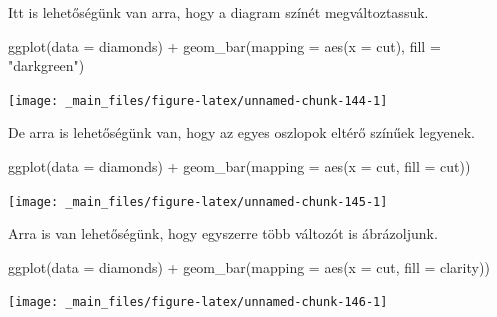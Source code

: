 \documentclass[
]{book}
\newenvironment{Shaded}{\begin{snugshade}}{\end{snugshade}}
\newcommand{\AttributeTok}[1]{\textcolor[rgb]{0.77,0.63,0.00}{#1}}
\newcommand{\FunctionTok}[1]{\textcolor[rgb]{0.00,0.00,0.00}{#1}}
\newcommand{\NormalTok}[1]{#1}
\newcommand{\SpecialCharTok}[1]{\textcolor[rgb]{0.00,0.00,0.00}{#1}}
\newcommand{\StringTok}[1]{\textcolor[rgb]{0.31,0.60,0.02}{#1}}
\begin{document}
Itt is lehetőségünk van arra, hogy a diagram színét megváltoztassuk.

\begin{Shaded}
\begin{Highlighting}[]
\FunctionTok{ggplot}\NormalTok{(}\AttributeTok{data =}\NormalTok{ diamonds) }\SpecialCharTok{+}
  \FunctionTok{geom\_bar}\NormalTok{(}\AttributeTok{mapping =} \FunctionTok{aes}\NormalTok{(}\AttributeTok{x =}\NormalTok{ cut), }\AttributeTok{fill =} \StringTok{"darkgreen"}\NormalTok{)}
\end{Highlighting}
\end{Shaded}

\begin{center}\texttt{[image: \_main\_files/figure-latex/unnamed-chunk-144-1]} \end{center}

De arra is lehetőségünk van, hogy az egyes oszlopok eltérő színűek
legyenek.

\begin{Shaded}
\begin{Highlighting}[]
\FunctionTok{ggplot}\NormalTok{(}\AttributeTok{data =}\NormalTok{ diamonds) }\SpecialCharTok{+}
  \FunctionTok{geom\_bar}\NormalTok{(}\AttributeTok{mapping =} \FunctionTok{aes}\NormalTok{(}\AttributeTok{x =}\NormalTok{ cut, }\AttributeTok{fill =}\NormalTok{ cut))}
\end{Highlighting}
\end{Shaded}

\begin{center}\texttt{[image: \_main\_files/figure-latex/unnamed-chunk-145-1]} \end{center}

Arra is van lehetőségünk, hogy egyszerre több változót is ábrázoljunk.

\begin{Shaded}
\begin{Highlighting}[]
\FunctionTok{ggplot}\NormalTok{(}\AttributeTok{data =}\NormalTok{ diamonds) }\SpecialCharTok{+}
  \FunctionTok{geom\_bar}\NormalTok{(}\AttributeTok{mapping =} \FunctionTok{aes}\NormalTok{(}\AttributeTok{x =}\NormalTok{ cut, }\AttributeTok{fill =}\NormalTok{ clarity))}
\end{Highlighting}
\end{Shaded}

\begin{center}\texttt{[image: \_main\_files/figure-latex/unnamed-chunk-146-1]} \end{center}
\end{document}
